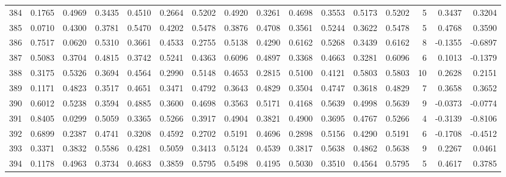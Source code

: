 \begin{tabular}{lrrrrrrrrrrrrrrr}
384 &      0.1765 &  0.4969 &  0.3435 &  0.4510 &  0.2664 &  0.5202 &  0.4920 &  0.3261 &  0.4698 &  0.3553 &   0.5173 &     0.5202 &      5 &                    0.3437 &                     0.3204 \\
385 &      0.0710 &  0.4300 &  0.3781 &  0.5470 &  0.4202 &  0.5478 &  0.3876 &  0.4708 &  0.3561 &  0.5244 &   0.3622 &     0.5478 &      5 &                    0.4768 &                     0.3590 \\
386 &      0.7517 &  0.0620 &  0.5310 &  0.3661 &  0.4533 &  0.2755 &  0.5138 &  0.4290 &  0.6162 &  0.5268 &   0.3439 &     0.6162 &      8 &                   -0.1355 &                    -0.6897 \\
387 &      0.5083 &  0.3704 &  0.4815 &  0.3742 &  0.5241 &  0.4363 &  0.6096 &  0.4897 &  0.3368 &  0.4663 &   0.3281 &     0.6096 &      6 &                    0.1013 &                    -0.1379 \\
388 &      0.3175 &  0.5326 &  0.3694 &  0.4564 &  0.2990 &  0.5148 &  0.4653 &  0.2815 &  0.5100 &  0.4121 &   0.5803 &     0.5803 &     10 &                    0.2628 &                     0.2151 \\
389 &      0.1171 &  0.4823 &  0.3517 &  0.4651 &  0.3471 &  0.4792 &  0.3643 &  0.4829 &  0.3504 &  0.4747 &   0.3618 &     0.4829 &      7 &                    0.3658 &                     0.3652 \\
390 &      0.6012 &  0.5238 &  0.3594 &  0.4885 &  0.3600 &  0.4698 &  0.3563 &  0.5171 &  0.4168 &  0.5639 &   0.4998 &     0.5639 &      9 &                   -0.0373 &                    -0.0774 \\
391 &      0.8405 &  0.0299 &  0.5059 &  0.3365 &  0.5266 &  0.3917 &  0.4904 &  0.3821 &  0.4900 &  0.3695 &   0.4767 &     0.5266 &      4 &                   -0.3139 &                    -0.8106 \\
392 &      0.6899 &  0.2387 &  0.4741 &  0.3208 &  0.4592 &  0.2702 &  0.5191 &  0.4696 &  0.2898 &  0.5156 &   0.4290 &     0.5191 &      6 &                   -0.1708 &                    -0.4512 \\
393 &      0.3371 &  0.3832 &  0.5586 &  0.4281 &  0.5059 &  0.3413 &  0.5124 &  0.4539 &  0.3817 &  0.5638 &   0.4862 &     0.5638 &      9 &                    0.2267 &                     0.0461 \\
394 &      0.1178 &  0.4963 &  0.3734 &  0.4683 &  0.3859 &  0.5795 &  0.5498 &  0.4195 &  0.5030 &  0.3510 &   0.4564 &     0.5795 &      5 &                    0.4617 &                     0.3785 \\

\end{tabular}
